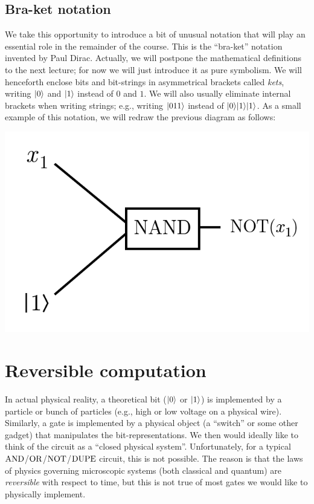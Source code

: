 \documentclass[12pt]{article}
\begin{document}
\subsection{Bra-ket notation}

We take this opportunity to introduce a bit of unusual notation that will play an essential role in the remainder of the course.  This is the ``bra-ket'' notation invented by Paul Dirac.  Actually, we will postpone the mathematical definitions to the next lecture; for now we will just introduce it as pure symbolism.  We will henceforth enclose bits and bit-strings in asymmetrical brackets called \emph{kets}, writing $\ket{0}$ and $\ket{1}$ instead of $0$ and $1$.  We will also usually eliminate internal brackets when writing strings; e.g., writing $\ket{011}$ instead of $\ket{0}\ket{1}\ket{1}$.  As a small example of this notation, we will redraw the previous diagram as follows:
\begin{center}
        \includegraphics[scale=.5]{lecture01-figure4.png}
\end{center}


\section{Reversible computation}

In actual physical reality, a theoretical bit ($\ket{0}$ or $\ket{1}$) is implemented by a particle or bunch of particles (e.g., high or low voltage on a physical wire).  Similarly, a gate is implemented by a physical object (a ``switch'' or some other gadget) that manipulates the bit-representations.  We then would ideally like to think of the circuit as a ``closed physical system''.  Unfortunately, for a typical $\AND$/$\OR$/$\NOT$/$\DUPE$ circuit, this is not possible.  The reason is that the laws of physics governing microscopic systems (both classical and quantum) are \emph{reversible} with respect to time, but this is not true of most gates we would like to physically implement.
\end{document}
